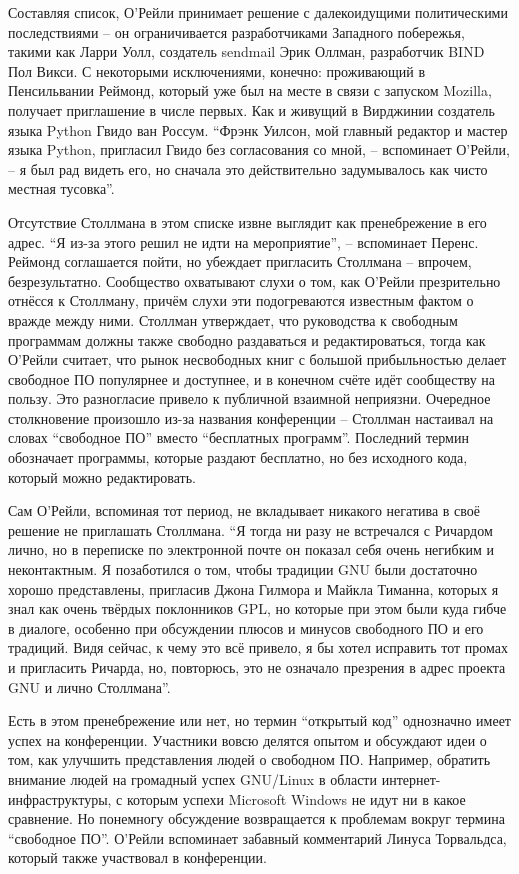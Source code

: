 Составляя список, О'Рейли принимает решение с далекоидущими политическими последствиями -- он ограничивается разработчиками Западного побережья, такими как Ларри Уолл, создатель sendmail Эрик Оллман, разработчик BIND Пол Викси. С некоторыми исключениями, конечно: проживающий в Пенсильвании Реймонд, который уже был на месте в связи с запуском Mozilla, получает приглашение в числе первых. Как и живущий в Вирджинии создатель языка Python Гвидо ван Россум. \enquote{Фрэнк Уилсон, мой главный редактор и мастер языка Python, пригласил Гвидо без согласования со мной, -- вспоминает О'Рейли, -- я был рад видеть его, но сначала это действительно задумывалось как чисто местная тусовка}.

Отсутствие Столлмана в этом списке извне выглядит как пренебрежение в его адрес. \enquote{Я из-за этого решил не идти на мероприятие}, -- вспоминает Перенс. Реймонд соглашается пойти, но убеждает пригласить Столлмана -- впрочем, безрезультатно. Сообщество охватывают слухи о том, как О'Рейли презрительно отнёсся к Столлману,  причём слухи эти подогреваются известным фактом о вражде между ними. Столлман утверждает, что руководства к свободным программам должны также свободно раздаваться и редактироваться, тогда как О'Рейли считает, что рынок несвободных книг с большой прибыльностью делает свободное ПО популярнее и доступнее, и в конечном счёте идёт сообществу на пользу. Это разногласие привело к публичной взаимной неприязни. Очередное столкновение произошло из-за названия конференции -- Столлман настаивал на словах \enquote{свободное ПО} вместо \enquote{бесплатных программ}. Последний термин обозначает программы, которые раздают бесплатно, но без исходного кода, который можно редактировать.

Сам О'Рейли, вспоминая тот период, не вкладывает никакого негатива в своё решение не приглашать Столлмана. \enquote{Я тогда ни разу не встречался с Ричардом лично, но в переписке по электронной почте он показал себя очень негибким и неконтактным. Я позаботился о том, чтобы традиции GNU были достаточно хорошо представлены, пригласив Джона Гилмора и Майкла Тиманна, которых я знал как очень твёрдых поклонников GPL, но которые при этом были куда гибче в диалоге, особенно при обсуждении плюсов и минусов свободного ПО и его традиций. Видя сейчас, к чему это всё привело, я бы хотел исправить тот промах и пригласить Ричарда, но, повторюсь, это не означало презрения в адрес проекта GNU и лично Столлмана}.

Есть в этом пренебрежение или нет, но термин \enquote{открытый код} однозначно имеет успех на конференции. Участники вовсю делятся опытом и обсуждают идеи о том, как улучшить представления людей о свободном ПО. Например, обратить внимание людей на громадный успех GNU/Linux в области интернет-инфраструктуры, с которым успехи Microsoft Windows не идут ни в какое сравнение. Но понемногу обсуждение возвращается к проблемам вокруг термина \enquote{свободное ПО}. О'Рейли вспоминает забавный комментарий Линуса Торвальдса, который также участвовал в конференции.

